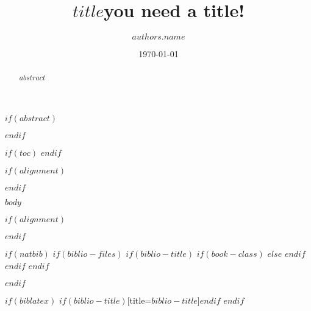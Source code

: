 \documentclass[fontsize=8pt,paper=a4,pagesize,abstracton]{scrartcl}
\title{\LARGE \bfseries $title$}
\title{you need a title!}
\author[1]{\normalsize $authors.name$}
\affil[1]{\small
  {\itshape\href{http://ohnosequences.com}{oh no sequences!}} research group, \href{http://www.era7bioinformatics.com}{Era7 bioinformatics}
}
\date{\normalsize \today}
\begin{document}
\maketitle

$if(abstract)$
\begin{abstract} %
$abstract$
\end{abstract}
$endif$

\thispagestyle{empty}

$if(toc)$
\tableofcontents
$endif$

\newpage

$if(alignment)$
\begin{$alignment$}
$endif$

$body$



$if(alignment)$
\end{$alignment$}
$endif$

$if(natbib)$
  $if(biblio-files)$
    $if(biblio-title)$
      $if(book-class)$
        \renewcommand\bibname{$biblio-title$}
      $else$
        \renewcommand\refname{$biblio-title$}
      $endif$
    $endif$
  $endif$
  
$endif$

$if(biblatex)$
  \printbibliography$if(biblio-title)$[title=$biblio-title$]$endif$
$endif$
\end{document}
